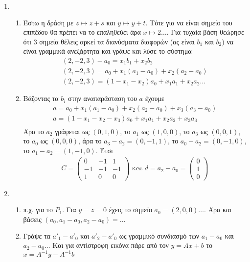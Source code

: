 \documentclass[12pt]{article}
\begin{document}
  \begin{enumerate}
    \item
    \begin{enumerate}
      \item Έστω η δράση με $z \mapsto z+s$ και $y \mapsto y+t$. Τότε για να είναι σημείο του επιπέδου θα πρέπει να το επαληθεύει άρα $x \mapsto 2 \ldots$. Για τυχαία βάση θεώρησε ότι 3 σημεία θέλεις αρκεί τα διανύσματα διαφορών (ας είναι $b_1$ και $b_2$) να είναι γραμμικά ανεξάρτητα και γράψε και λύσε το σύστημα
      \begin{gather}
        (2,-2,3)-a_0=x_1b_1+x_2b_2 \\
        (2,-2,3)=a_0+x_1(a_1-a_0)+x_2(a_2-a_0) \\
        (2,-2,3)=(1-x_1-x_2)a_0+x_1a_1+x_2a_2 \ldots
      \end{gather}

      \item Βάζοντας τα $b_i$ στην αναπαράσταση του $a$ έχουμε
      \begin{gather}
        a=a_0+x_1(a_1-a_0)+x_2(a_2-a_0)+x_3(a_3-a_0) \\
        a=(1-x_1-x_2-x_3)a_0+x_1a_1+x_2a_2+x_3a_3 \\
      \end{gather}
      Άρα το $a_2$ γράφεται ως $(0,1,0)$, το $a_1$ ως $(1,0,0)$, το $a_3$ ως $(0,0,1)$, το $a_0$ ως $(0,0,0)$, άρα το $a_3-a_2=(0,-1,1)$, το $a_0-a_2=(0,-1,0)$, το $a_1-a_2=(1,-1,0)$. Έτσι
      \begin{gather}
        C=
        \begin{pmatrix}
          0 & -1 & 1 \\
          -1 & -1 & -1 \\
          1 & 0 & 0
        \end{pmatrix}
         \text{ και } d=a_2-a_0=
       \begin{pmatrix}
         0 \\
         1 \\
         0
       \end{pmatrix}
      \end{gather}

    \end{enumerate}

    \item
    \begin{enumerate}
      \item
        π.χ. για το $P_1$. Για $y=z=0$ έχεις το σημείο $a_0=(2,0,0)\ldots$. Άρα και βάσεις $(a_0,a_1-a_0,a_2-a_0)=\ldots$
      \item
        Γράψε τα $a'_1-a'_0$ και $a'_2-a'_0$ ως γραμμικό συνδιασμό των $a_1-a_0$ και $a_2-a_0$... Και για αντίστροφη εικόνα πάρε από τον $y=Ax+b$ το $x=A^{-1}y-A^{-1}b$
    \end{enumerate}


\end{enumerate}
\end{document}
